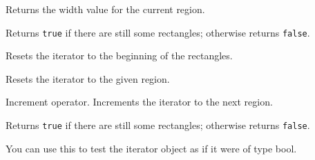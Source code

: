 \label{wxregioniteratorgetwidth}


Returns the width value for the current region.


\label{wxregioniteratorhaverects}


Returns {\tt true} if there are still some rectangles; otherwise returns {\tt false}.


\label{wxregioniteratorreset}


Resets the iterator to the beginning of the rectangles.


Resets the iterator to the given region.


\label{wxregioniteratorinc}


Increment operator. Increments the iterator to the next region.



\label{wxregioniteratorbool}


Returns {\tt true} if there are still some rectangles; otherwise returns {\tt false}.

You can use this to test the iterator object as if it were of type bool.

